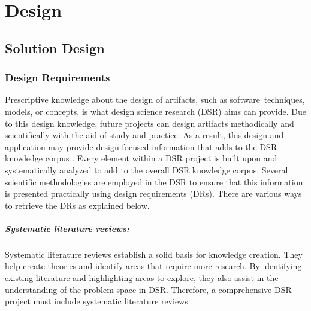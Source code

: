 
\chapter{Design}

\ifpdf
    \graphicspath{{Chapters/Design/Figs/}{Chapters/Design/Figs/}{Chapters/Design/Figs/}}
\else
    \graphicspath{{Chapters/Design/Figs/}{Chapters/Design/Figs/}}
\fi
\section{Solution Design}

\subsection{Design Requirements}
\label{design:section:designReqs}
Prescriptive knowledge about the design of artifacts, such as software techniques, models, or concepts, is what design science research (DSR) aims can provide. 
Due to this design knowledge, future projects can design artifacts methodically and scientifically with the aid of study and practice. 
As a result, this design and application may provide design-focused information that adds to the DSR knowledge corpus \cite{misc:dsr:henver}.
Every element within a DSR project is built upon and systematically analyzed to add to the overall DSR knowledge corpus.
Several scientific methodologies are employed in the DSR to ensure that this information is presented practically using design requirements (DRs).
There are various ways to retrieve the DRs as explained below.

\paragraph*{Systematic literature reviews:} 
Systematic literature reviews establish a solid basis for knowledge creation. 
They help create theories and identify areas that require more research.
By identifying existing literature and highlighting areas to explore, they also assist in the understanding of the problem space in DSR.
Therefore, a comprehensive DSR project must include systematic literature reviews \cite{misc:dsr:webster}.

